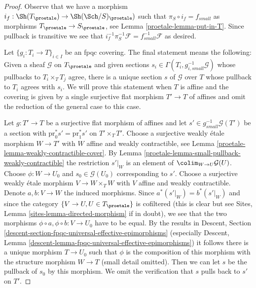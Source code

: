 \begin{proof}

Observe that we have a morphism
$i_f : \Sh(T_\proetale) \to \Sh(\Sch/S)_\proetale)$
such that $\pi_S \circ i_f = f_{small}$ as morphisms
$T_\proetale \to S_\proetale$, see Lemma \ref{proetale-lemma-put-in-T}.
Since pullback is transitive we see that
$i_f^{-1} \pi_S^{-1}\mathcal{F} = f_{small}^{-1}\mathcal{F}$ as desired.

\medskip\noindent
Let $\{g_i : T_i \to T\}_{i \in I}$ be an fpqc covering. The final statement
means the following: Given a sheaf $\mathcal{G}$ on $T_\proetale$ and given
sections $s_i \in \Gamma(T_i, g_{i, small}^{-1}\mathcal{G})$ whose pullbacks
to $T_i \times_T T_j$ agree, there is a unique section $s$ of $\mathcal{G}$
over $T$ whose pullback to $T_i$ agrees with $s_i$. We will prove this
statement when $T$ is affine and the covering is given by a single
surjective flat morphism $T' \to T$ of affines and omit the reduction of
the general case to this case.

\medskip\noindent
Let $g : T' \to T$ be a surjective flat morphism of affines and let
$s' \in g_{small}^{-1}\mathcal{G}(T')$ be a section with
$\text{pr}_0^*s' = \text{pr}_1^*s'$ on $T' \times_T T'$.
Choose a surjective weakly \'etale morphism $W \to T'$ with
$W$ affine and weakly contractible, see
Lemma \ref{proetale-lemma-weakly-contractible-cover}. By
Lemma \ref{proetale-lemma-small-pullback-weakly-contractible}
the restriction $s'|_W$ is an element of $\colim_{W \to U} \mathcal{G}(U)$.
Choose $\phi : W \to U_0$ and $s_0 \in \mathcal{G}(U_0)$ corresponding to $s'$.
Choose a surjective weakly \'etale morphism $V \to W \times_T W$
with $V$ affine and weakly contractible.
Denote $a, b : V \to W$ the induced morphisms.
Since $a^*(s'|_W) = b^*(s'|_W)$ and since the category
$\{V \to U, U \in T_\proetale\}$ is cofiltered
(this is clear but see
Sites, Lemma \ref{sites-lemma-directed-morphism} if in doubt),
we see that the two morphisms $\phi \circ a , \phi \circ b : V \to U_0$
have to be equal. By the results in
Descent, Section \ref{descent-section-fpqc-universal-effective-epimorphisms}
(especially
Descent, Lemma \ref{descent-lemma-fpqc-universal-effective-epimorphisms})
it follows there is a unique morphism $T \to U_0$ such that $\phi$
is the composition of this morphism with the structure morphism $W \to T$
(small detail omitted). Then we can let $s$ be the pullback
of $s_0$ by this morphism. We omit the verification that
$s$ pulls back to $s'$ on $T'$.
\end{proof}

